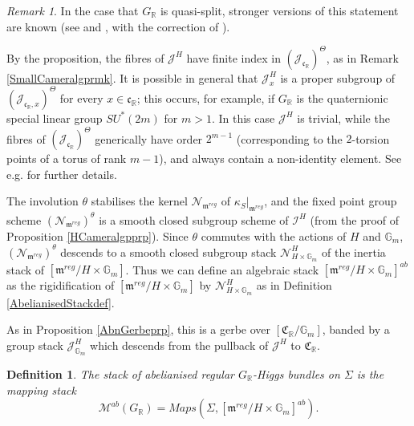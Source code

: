 \documentclass{amsart}
\newtheorem{definition}[theorem]{Definition}
\theoremstyle{remark}
\newtheorem{remark}[theorem]{Remark}
\numberwithin{theorem}{section}
\numberwithin{equation}{section}
\begin{document}
\begin{remark}\label{HCameralgprmk}
    In the case that $G_\mathbb{R}$ is quasi-split, stronger versions of this statement are known (see \cite[Theorem 4.7]{Leslie} and \cite[Theorem 21]{GPPN}, with the correction of \cite[Proposition 4.14]{HM}).
    
    By the proposition, the fibres of $\mathcal J^H$ have finite index in $(\mathcal J_{\mathfrak{c}_\mathbb{R}})^\Theta$, as in Remark \ref{SmallCameralgprmk}. It is possible in general that $\mathcal J^H_x$ is a proper subgroup of $(\mathcal J_{\mathfrak{c}_\mathbb{R},x})^\Theta$ for every $x \in \mathfrak{c}_{\mathbb{R}}$; this occurs, for example, if $G_{\mathbb{R}}$ is the quaternionic special linear group $SU^*(2m)$ for $m >1$. In this case $\mathcal J^H$ is trivial, while the fibres of $(\mathcal J_{\mathfrak{c}_\mathbb{R}})^\Theta$ generically have order $2^{m-1}$ (corresponding to the $2$-torsion points of a torus of rank $m-1$), and always contain a non-identity element. See e.g. \cite[Section 12.3.2, Type AII]{GW} for further details.
\end{remark}

The involution $\theta$ stabilises the kernel $\mathcal N_{\mathfrak{m}^{reg}}$ of $\kappa_S|_{\mathfrak{m}^{reg}}$, and the fixed point group scheme $(\mathcal N_{\mathfrak{m}^{reg}})^\theta$ is a smooth closed subgroup scheme of $\mathcal I^H$ (from the proof of Proposition \ref{HCameralgpprp}). Since $\theta$ commutes with the actions of $H$ and $\mathbb{G}_m$, $(\mathcal N_{\mathfrak{m}^{reg}})^\theta$ descends to a smooth closed subgroup stack $\mathcal N^H_{H\times \mathbb{G}_m}$ of the inertia stack of $[\mathfrak{m}^{reg}/H \times \mathbb{G}_m]$. Thus we can define an algebraic stack $[\mathfrak{m}^{reg}/H\times \mathbb{G}_m]^{ab}$ as the rigidification of $[\mathfrak{m}^{reg}/H\times \mathbb{G}_m]$ by $ \mathcal N^H_{H \times \mathbb{G}_m}$ as in Definition \ref{AbelianisedStackdef}.

As in Proposition \ref{AbnGerbeprp}, this is a gerbe over $[\mathfrak{C}_{\mathbb{R}}/\mathbb{G}_m]$, banded by a group stack $\mathcal J^H_{\mathbb{G}_m}$ which descends from the pullback of $\mathcal J^H$ to $\mathfrak{C}_\mathbb{R}$.

\begin{definition}\label{AbnsdGRHiggsdef}
    The \emph{stack of abelianised regular $G_\mathbb{R}$-Higgs bundles on $\Sigma$} is the mapping stack
    \begin{equation}\label{AbnsdGRHiggs1eqn}
        \mathcal M^{ab}(G_\mathbb{R}) = Maps(\Sigma,[\mathfrak{m}^{reg}/H \times \mathbb{G}_m]^{ab}).
    \end{equation}
\end{definition}
\end{document}
